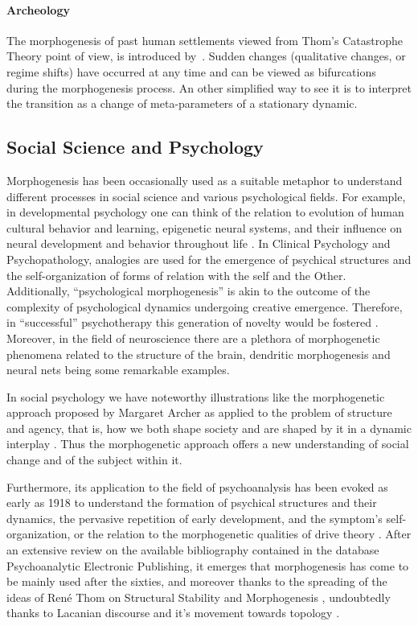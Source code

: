\documentclass[fleqn,10pt]{wlscirep}
\begin{document}
\paragraph{Archeology}

The morphogenesis of past human settlements viewed from Thom's Catastrophe Theory point of view, is introduced by~\cite{renfrew1978trajectory}. Sudden changes (qualitative changes, or regime shifts) have occurred at any time and can be viewed as bifurcations during the morphogenesis process. An other simplified way to see it is to interpret the transition as a change of meta-parameters of a stationary dynamic.




\subsection*{Social Science and Psychology}


Morphogenesis has been occasionally used as a suitable metaphor to understand different processes in social science and various psychological fields. For example, in developmental psychology one can think of the relation to evolution of human cultural behavior and learning, epigenetic neural systems, and their influence on neural development and behavior throughout life \cite{hart_held_2013}. In Clinical Psychology and Psychopathology, analogies are used for the emergence of psychical structures and the self-organization of forms of relation with the self and the Other. Additionally, “psychological morphogenesis” is akin to the outcome of the complexity of psychological dynamics undergoing creative emergence. Therefore, in “successful” psychotherapy this generation of novelty would be fostered \cite{piers_self-organizing_2007}. Moreover, in the field of neuroscience there are a plethora of morphogenetic phenomena related to the structure of the brain, dendritic morphogenesis and neural nets being some remarkable examples.\cite{_issues_2013}

In social psychology we have noteworthy illustrations like the morphogenetic approach proposed by Margaret Archer as applied to the problem of structure and agency, that is, how we both shape society and are shaped by it in a dynamic interplay \cite{archer_margaret_1999}. Thus the morphogenetic approach offers a new understanding of social change and of the subject within it.  

Furthermore, its application to the field of psychoanalysis has been evoked as early as 1918 to understand the formation of psychical structures and their dynamics, the pervasive repetition of early development, and the symptom’s self-organization, or the relation to the morphogenetic qualities of drive theory \cite{benedek_instinct_1973}. After an extensive review on the available bibliography contained in the database Psychoanalytic Electronic Publishing, it emerges that morphogenesis has come to be mainly used after the sixties, and moreover thanks to the spreading of the ideas of René Thom on Structural Stability and Morphogenesis \cite{de_luca_picione_processes_2016}, undoubtedly thanks to Lacanian discourse and it’s movement towards topology \cite{nasio_five_1998}. 
\end{document}
